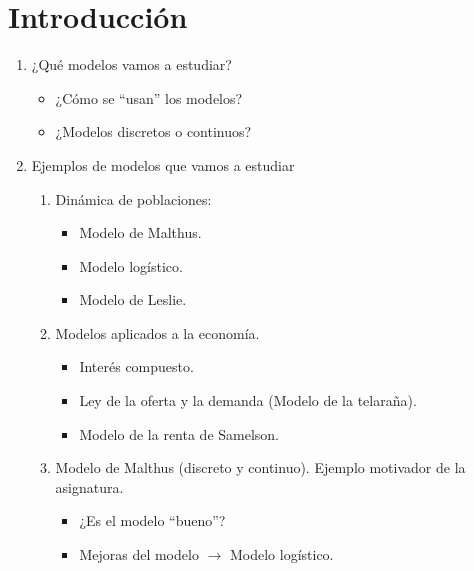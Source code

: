 \chapter{Introducción}\label{chp:Tema0}

\begin{enumerate}
    \item ¿Qué modelos vamos a estudiar?
    \begin{itemize}
        \item ¿Cómo se ``usan'' los modelos?
        \item ¿Modelos discretos o continuos?
    \end{itemize}
    \item Ejemplos de modelos que vamos a estudiar
    \begin{enumerate}
        \item Dinámica de poblaciones:
        \begin{itemize}
            \item Modelo de Malthus.
            \item Modelo logístico.
            \item Modelo de Leslie.
        \end{itemize}
        \item Modelos aplicados a la economía.
        \begin{itemize}
            \item Interés compuesto.
            \item Ley de la oferta y la demanda (Modelo de la telaraña).
            \item Modelo de la renta de Samelson.
        \end{itemize}
        \item Modelo de Malthus (discreto y continuo). Ejemplo motivador de la asignatura.
        \begin{itemize}
            \item ¿Es el modelo ``bueno''?
            \item Mejoras del modelo $\rightarrow$ Modelo logístico.
        \end{itemize}
    \end{enumerate}
\end{enumerate}

